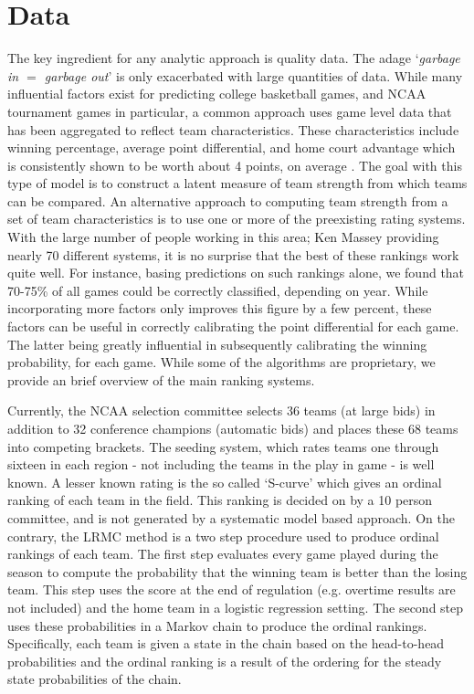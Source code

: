 \documentclass[letterpaper,12pt]{article}
\begin{document}
\section{Data}
The key ingredient for any analytic approach is quality data. The adage `\emph{garbage in $=$ garbage out}' is only exacerbated with large quantities of data. While many influential factors exist for predicting college basketball games, and NCAA tournament games in particular, a common approach uses game level data that has been aggregated to reflect team characteristics. These characteristics include winning percentage, average point differential, and home court advantage which is consistently shown to be worth about 4 points, on average \citep{harville1994}. The goal with this type of model is to construct a latent measure of team strength from which teams can be compared. An alternative approach to computing team strength from a set of team characteristics is to use one or more of the preexisting rating systems. With the large number of people working in this area; Ken Massey \citep{kenmassey.com} providing nearly 70 different systems, it is no surprise that the best of these rankings work quite well. For instance, basing predictions on such rankings alone, we found that 70-75\% of all games could be correctly classified, depending on year. While incorporating more factors only improves this figure by a few percent, these factors can be useful in correctly calibrating the point differential for each game. The latter being greatly influential in subsequently calibrating the winning probability, for each game.
While some of the algorithms are proprietary, we provide an brief overview of the main ranking systems.

Currently, the NCAA selection committee selects 36 teams (at large bids) in addition to 32 conference champions (automatic bids) and places these 68 teams into competing brackets. The seeding system, which rates teams one through sixteen in each region - not including the teams in the play in game - is well known. A lesser known rating is the so called `S-curve' which gives an ordinal ranking of each team in the field. This ranking is decided on by a 10 person committee, and is not generated by a systematic model based approach. On the contrary, 
the LRMC method \citep{Kvam2006, mark2010} is a two step procedure used to produce ordinal rankings of each team. The first step evaluates every game played during the season to compute the probability that the winning team is better than the losing team. This step uses the score at the end of regulation (e.g. overtime results are not included) and the home team in a logistic regression setting. The second step uses these probabilities in a Markov chain to produce the ordinal rankings. Specifically, each team is given a state in the chain based on the head-to-head probabilities and the ordinal ranking is a result of the ordering for the steady state probabilities of the chain.
\end{document}
